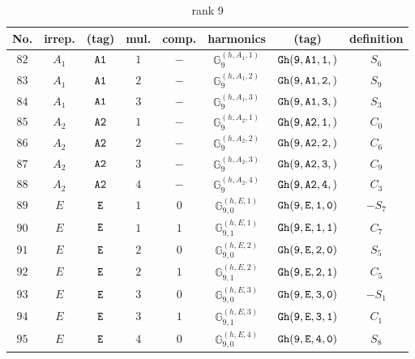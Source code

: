 \documentclass[fleqn,8pt]{jsarticle}
\begin{document}
\begin{table}[ht!]
\begin{center}
\caption{rank 9}
\renewcommand{\arraystretch}{1.3}
\begin{tabular}{cccccccc} \hline \hline
No. & irrep. & (tag) & mul. & comp. & harmonics & (tag) & definition \\ \hline
$ 82 $ & $ A_{1} $ & $ {\tt A1} $ & $ 1 $ & $ - $ & $ \mathbb{G}_{9}^{(h,A_{1},1)} $ & $ {\tt Gh(9,A1,1,)} $ & $ S_{6} $ \\
$ 83 $ & $ A_{1} $ & $ {\tt A1} $ & $ 2 $ & $ - $ & $ \mathbb{G}_{9}^{(h,A_{1},2)} $ & $ {\tt Gh(9,A1,2,)} $ & $ S_{9} $ \\
$ 84 $ & $ A_{1} $ & $ {\tt A1} $ & $ 3 $ & $ - $ & $ \mathbb{G}_{9}^{(h,A_{1},3)} $ & $ {\tt Gh(9,A1,3,)} $ & $ S_{3} $ \\
$ 85 $ & $ A_{2} $ & $ {\tt A2} $ & $ 1 $ & $ - $ & $ \mathbb{G}_{9}^{(h,A_{2},1)} $ & $ {\tt Gh(9,A2,1,)} $ & $ C_{0} $ \\
$ 86 $ & $ A_{2} $ & $ {\tt A2} $ & $ 2 $ & $ - $ & $ \mathbb{G}_{9}^{(h,A_{2},2)} $ & $ {\tt Gh(9,A2,2,)} $ & $ C_{6} $ \\
$ 87 $ & $ A_{2} $ & $ {\tt A2} $ & $ 3 $ & $ - $ & $ \mathbb{G}_{9}^{(h,A_{2},3)} $ & $ {\tt Gh(9,A2,3,)} $ & $ C_{9} $ \\
$ 88 $ & $ A_{2} $ & $ {\tt A2} $ & $ 4 $ & $ - $ & $ \mathbb{G}_{9}^{(h,A_{2},4)} $ & $ {\tt Gh(9,A2,4,)} $ & $ C_{3} $ \\
$ 89 $ & $ E $ & $ {\tt E} $ & $ 1 $ & $ 0 $ & $ \mathbb{G}_{9,0}^{(h,E,1)} $ & $ {\tt Gh(9,E,1,0)} $ & $ - S_{7} $ \\
$ 90 $ & $ E $ & $ {\tt E} $ & $ 1 $ & $ 1 $ & $ \mathbb{G}_{9,1}^{(h,E,1)} $ & $ {\tt Gh(9,E,1,1)} $ & $ C_{7} $ \\
$ 91 $ & $ E $ & $ {\tt E} $ & $ 2 $ & $ 0 $ & $ \mathbb{G}_{9,0}^{(h,E,2)} $ & $ {\tt Gh(9,E,2,0)} $ & $ S_{5} $ \\
$ 92 $ & $ E $ & $ {\tt E} $ & $ 2 $ & $ 1 $ & $ \mathbb{G}_{9,1}^{(h,E,2)} $ & $ {\tt Gh(9,E,2,1)} $ & $ C_{5} $ \\
$ 93 $ & $ E $ & $ {\tt E} $ & $ 3 $ & $ 0 $ & $ \mathbb{G}_{9,0}^{(h,E,3)} $ & $ {\tt Gh(9,E,3,0)} $ & $ - S_{1} $ \\
$ 94 $ & $ E $ & $ {\tt E} $ & $ 3 $ & $ 1 $ & $ \mathbb{G}_{9,1}^{(h,E,3)} $ & $ {\tt Gh(9,E,3,1)} $ & $ C_{1} $ \\
$ 95 $ & $ E $ & $ {\tt E} $ & $ 4 $ & $ 0 $ & $ \mathbb{G}_{9,0}^{(h,E,4)} $ & $ {\tt Gh(9,E,4,0)} $ & $ S_{8} $ \\

\end{tabular}
\end{center}
\end{table}
\end{document}

